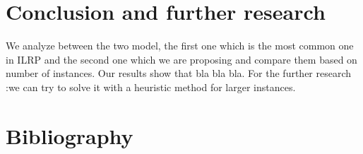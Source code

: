 \documentclass[12pt, a4paper]{article}
\begin{document}
\section{Conclusion and further research}
We analyze between the two model, the first one which is the most common one in ILRP and the second one which we are proposing and compare them based on number of instances. Our results show that bla bla bla. For the further research :we can try to solve it with a heuristic method for larger instances.

    
\section{Bibliography}
\printbibliography
\end{document}
